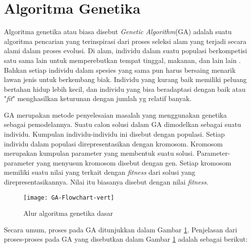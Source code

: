 \section{Algoritma Genetika}
\label{sec:GA}
Algoritma genetika atau biasa disebut \textit{Genetic Algorithm}(GA) adalah suatu algoritma pencarian yang terinspirasi dari proses seleksi alam yang terjadi secara alami dalam proses evolusi. Di alam, individu dalam suatu populasi berkompetisi satu sama lain untuk memperebutkan tempat tinggal, makanan, dan lain lain \cite{sivanandam2007introduction}. Bahkan setiap individu dalam spesies yang sama pun harus bersaing menarik lawan jenis untuk berkembang biak. Individu yang kurang baik memiliki peluang bertahan hidup lebih kecil, dan individu yang bisa beradaptasi dengan baik atau "\textit{fit}" menghasilkan keturunan dengan jumlah yg relatif banyak. 

GA merupakan metode penyelesaian masalah yang menggunakan genetika sebagai pemodelannya. Suatu calon solusi dalam GA dimodelkan sebagai suatu individu. Kumpulan individu-individu ini disebut dengan populasi. Setiap individu dalam populasi direpresentasikan dengan kromosom. Kromosom merupakan kumpulan parameter yang membentuk suatu solusi. Parameter-parameter yang menyusun kromosom disebut dengan gen. Setiap kromosom memiliki suatu nilai yang terkait dengan \textit{fitness} dari solusi yang direpresentasikannya. Nilai itu biasanya disebut dengan nilai \textit{fitness}.


\begin{figure}[H]
	\centering
	\texttt{[image: GA-Flowchart-vert]}
	\caption{Alur algoritma genetika dasar}
	\label{fig:GA-flowchart}
\end{figure}

Secara umum, proses pada GA ditunjukkan dalam Gambar \ref{fig:GA-flowchart}. Penjelasan dari proses-proses pada GA yang disebutkan dalam Gambar \ref{fig:GA-flowchart} adalah sebagai berikut:

